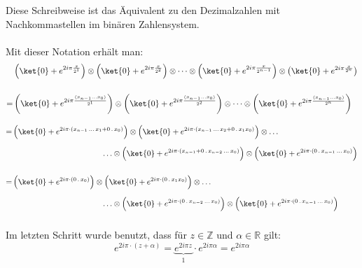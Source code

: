 \noindent Diese Schreibweise ist das Äquivalent zu den Dezimalzahlen mit Nachkommastellen im binären Zahlensystem.
\paragraph{}
\noindent Mit dieser Notation erhält man: 
\[\begin{split}
    &\left( \ket{0}+ e^{2i \pi \frac{x}{2^{1} } }\right)\otimes\left( \ket{0}+ e^{2i \pi \frac{x}{2^{2} } }\right)\otimes \dots \otimes\left( \ket{0}+ e^{2i \pi \frac{x}{2^{n-1} } }\right)\otimes\left( \ket{0}+ e^{2i \pi \frac{x}{2^{n} } }\right) \\[0.5cm]
    =&\left( \ket{0}+ e^{2i \pi \frac{(x_{n-1}\ldots x_0)}{2^{1} } }\right)\otimes\left( \ket{0}+ e^{2i \pi \frac{(x_{n-1}\ldots x_0)}{2^{2} } }\right)\otimes \dots \otimes\left( \ket{0}+ e^{2i \pi \frac{(x_{n-1}\ldots x_0)}{2^{n} } }\right) \\
    \end{split}\]
    
    \[\begin{split}
    =&\left( \ket{0}+ e^{2i \pi \cdot (x_{n-1}\,\ldots\, x_1 + 0\,.\,x_0)}\right)\otimes\left( \ket{0}+ e^{2i \pi \cdot (x_{n-1}\,\ldots\, x_{2}+0\,.\,x_{1} x_0) }\right)\otimes \dots \\[0.2cm]
    &\hspace{4cm}\ldots\otimes\left( \ket{0}+ e^{2i \pi \cdot (x_{n-1}+0\,.\,x_{n-2}\,\ldots\, x_0) }\right)\otimes\left( \ket{0}+ e^{2i \pi \cdot (0\,.\,x_{n-1}\,\ldots\, x_0) } \right) \\[0.5cm]
    =&\left( \ket{0}+ e^{2i \pi \cdot (0\,.\,x_0)}\right)\otimes\left( \ket{0}+ e^{2i \pi \cdot (0\,.\,x_{1} x_0) }\right)\otimes \dots \\[0.2cm]
    &\hspace{4cm}\ldots\otimes\left( \ket{0}+ e^{2i \pi \cdot (0\,.\,x_{n-2}\,\ldots\, x_0) }\right)\otimes\left( \ket{0}+ e^{2i \pi \cdot (0\,.\,x_{n-1}\,\ldots\, x_0) } \right) \\[0.3cm]
    \end{split}\]

\noindent Im letzten Schritt wurde benutzt, dass für $z \in \mathbb{Z}$ und $\alpha \in \mathbb{R}$ gilt:
\[ e^{2i \pi\cdot (z+\alpha)}= \underbrace{e^{2i \pi z}}_{1}\cdot e^{2i \pi \alpha}=e^{2i \pi \alpha}\]

\paragraph{}

